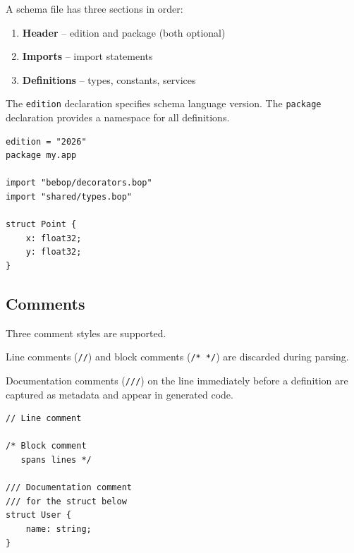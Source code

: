 \documentclass[11pt,onecolumn]{article}
\begin{document}
\begin{minipage}{\textwidth}
\begin{minipage}[t]{0.52\textwidth}
A schema file has three sections in order:

\begin{enumerate}[leftmargin=1.5em,itemsep=2pt,topsep=4pt]
\item \textbf{Header} -- edition and package (both optional)
\item \textbf{Imports} -- import statements
\item \textbf{Definitions} -- types, constants, services
\end{enumerate}

The \texttt{edition} declaration specifies schema language version. The \texttt{package} declaration provides a namespace for all definitions.
\end{minipage}\hfill
\begin{minipage}[t]{0.44\textwidth}
\begin{lstlisting}[language=bebop,aboveskip=0pt,belowskip=0pt]
edition = "2026"
package my.app

import "bebop/decorators.bop"
import "shared/types.bop"

struct Point {
    x: float32;
    y: float32;
}
\end{lstlisting}
\end{minipage}
\end{minipage}

\subsection{Comments}

\begin{minipage}{\textwidth}
\begin{minipage}[t]{0.52\textwidth}
Three comment styles are supported.

Line comments (\texttt{//}) and block comments (\texttt{/* */}) are discarded during parsing.

\raggedright
Documentation comments (\texttt{///}) on the line immediately before a definition are captured as metadata and appear in generated code.
\end{minipage}\hfill
\begin{minipage}[t]{0.44\textwidth}
\begin{lstlisting}[language=bebop,aboveskip=0pt,belowskip=0pt]
// Line comment

/* Block comment
   spans lines */

/// Documentation comment
/// for the struct below
struct User {
    name: string;
}
\end{lstlisting}
\end{minipage}
\end{minipage}
\end{document}
